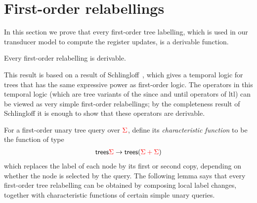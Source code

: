 \section{First-order  relabellings}\label{sec:fo-translation}
In this section we prove that every first-order tree labelling, which is used in our transducer model to compute the register updates, is a derivable function. 
\begin{proposition} \label{prop:forat}    
    Every first-order relabelling is derivable.
\end{proposition}
This result is based on a result of Schlingloff~\cite[Theorem 4.5]{schlingloff1992expressive}, which gives a temporal logic for trees that has the same expressive power as first-order logic. The operators in this temporal logic (which are tree variants of the since and until operators of {\sc ltl}) can be viewed as very simple first-order relabellings; by the completeness result of Schlingloff it is enough to show that these operators are derivable.  

For a first-order  unary tree query  over ${\color{red}{\Sigma}}$,  define its  \emph{characteristic function} to be the function of type
\begin{align*}
 \mathsf {trees} {\color{red}{\Sigma}} \to \mathsf {trees} ({\color{red}{{\color{red}{\Sigma}}+ {\color{red}{\Sigma}}}})
\end{align*}
which replaces the label of each node by its first or second copy, depending on whether the node is selected by the query. The following lemma says that every first-order tree relabelling can be obtained by composing local label changes, together with characteristic functions of certain simple unary queries. 

